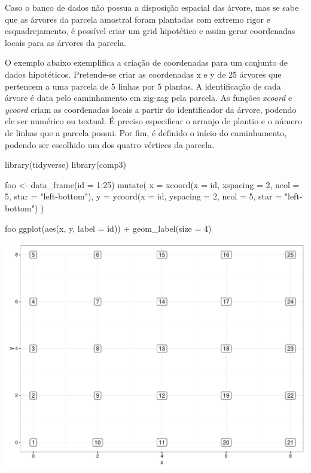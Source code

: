 \documentclass[article]{jss}
\begin{document}
Caso o banco de dados não possua a disposição espacial das árvore, mas
se sabe que as árvores da parcela amostral foram plantadas com extremo
rigor e esquadrejamento, é possível criar um grid hipotético e assim
gerar coordenadas locais para as árvores da parcela.

O exemplo abaixo exemplifica a criação de coordenadas para um conjunto
de dados hipotéticos. Pretende-se criar as coordenadas x e y de 25
árvores que pertencem a uma parcela de 5 linhas por 5 plantas. A
identificação de cada árvore é data pelo caminhamento em zig-zag pela
parcela. As funções \emph{xcoord} e \emph{ycoord} criam as coordenadas
locais a partir do identificador da árvore, podendo ele ser numérico ou
textual. É preciso especificar o arranjo de plantio e o número de linhas
que a parcela possui. Por fim, é definido o início do caminhamento,
podendo ser escolhido um dos quatro vértices da parcela.

\begin{CodeChunk}
\begin{CodeInput}
library(tidyverse)
library(comp3)

foo <- data_frame(id = 1:25) %
  mutate(
    x = xcoord(x = id, xspacing =  2, ncol =  5, star = "left-bottom"),
    y = ycoord(x = id, yspacing =  2, ncol =  5, star = "left-bottom")
  ) 

foo %
  ggplot(aes(x, y, label = id)) +
  geom_label(size = 4)
\end{CodeInput}


\begin{center}\includegraphics{comp3-paper_files/figure-latex/unnamed-chunk-2-1} \end{center}

\end{CodeChunk}
\end{document}
